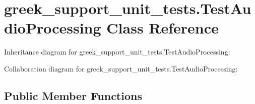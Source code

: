 \hypertarget{classgreek__support__unit__tests_1_1TestAudioProcessing}{\section{greek\-\_\-support\-\_\-unit\-\_\-tests.\-Test\-Audio\-Processing Class Reference}
\label{classgreek__support__unit__tests_1_1TestAudioProcessing}
}


Inheritance diagram for greek\-\_\-support\-\_\-unit\-\_\-tests.\-Test\-Audio\-Processing\-:


Collaboration diagram for greek\-\_\-support\-\_\-unit\-\_\-tests.\-Test\-Audio\-Processing\-:
\subsection*{Public Member Functions}
